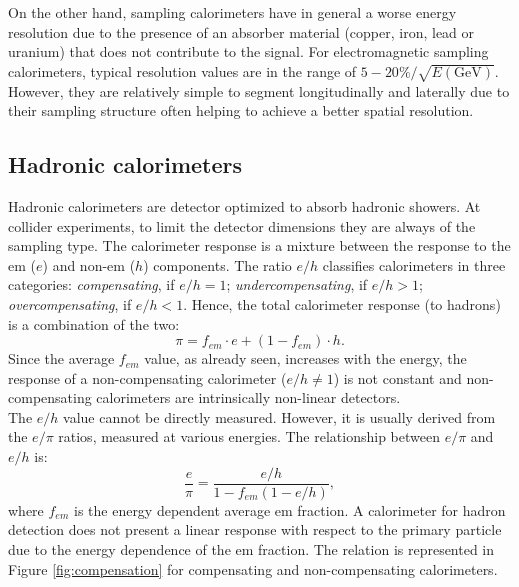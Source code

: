 On the other hand, sampling calorimeters have in general a worse energy resolution due to the presence of an absorber material (copper, iron, lead or uranium) that does not contribute to the signal. For electromagnetic sampling calorimeters, typical resolution values are in the range of $5-20 \% / \sqrt{E(\text{GeV})}$. However, they are relatively simple to segment longitudinally and laterally due to their sampling structure often helping to achieve a better spatial resolution.

\subsection*{Hadronic calorimeters}
Hadronic calorimeters are detector optimized to absorb hadronic showers. At collider experiments, to limit the detector dimensions they are always of the sampling type. The calorimeter response is a mixture between the response to the em ($e$) and non-em ($h$) components. The ratio $e/h$ classifies calorimeters in three categories: \textit{compensating}, if $e/h=1$; \textit{undercompensating}, if $e/h>1$; \textit{overcompensating}, if $e/h<1$. Hence, the total calorimeter response (to hadrons) is a combination of the two:
\begin{equation}
    \pi = f_{em} \cdot e + (1- f_{em}) \cdot h.
\end{equation}
Since the average $f_{em}$ value, as already seen, increases with the energy, the response of a non-compensating calorimeter ($e/h \neq  1$) is not constant and non-compensating calorimeters are intrinsically non-linear detectors.\\
The $e/h$ value cannot be directly measured. However, it is usually derived from the $e/\pi$ ratios, measured at various energies. The relationship between $e/\pi$ and $e/h$ is:
\begin{equation}
    \frac{e}{\pi} = \frac{e/h}{1 - f_{em}(1-e/h)},
\end{equation}
where $f_{em}$ is the energy dependent average em fraction. A calorimeter for hadron detection does not present a linear response with respect to the primary particle due to the energy dependence of the em fraction. The relation is represented in Figure \ref{fig:compensation} for compensating and non-compensating calorimeters.\\


